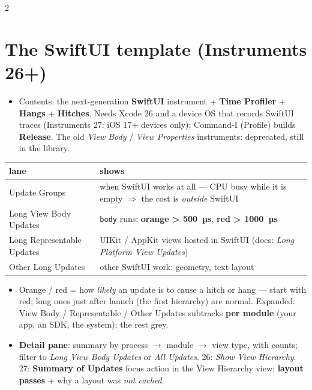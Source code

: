 \documentclass[8pt]{extarticle}
\begin{document}
\begin{multicols}{2}
\raggedright

\section{The SwiftUI template (Instruments 26+)}
\begin{itemize}
  \item Contents: the next-generation \textbf{SwiftUI} instrument + \textbf{Time Profiler} +
        \textbf{Hangs} + \textbf{Hitches}. Needs Xcode 26 and a device OS that records SwiftUI
        traces (Instruments 27: iOS 17+ devices only); Command-I (Profile) builds
        \textbf{Release}. The old \emph{View Body} / \emph{View Properties} instruments:
        deprecated, still in the library.
\end{itemize}
{\footnotesize
\begin{tabular}{@{}>{\raggedright\arraybackslash}p{2.15cm}>{\raggedright\arraybackslash}p{5.4cm}@{}}
\toprule
\textbf{lane} & \textbf{shows} \\
\midrule
Update Groups & when SwiftUI works at all — CPU busy while it is empty $\Rightarrow$ the cost is
\emph{outside} SwiftUI \\
Long View Body Updates & \texttt{body} runs: \textcolor{sheetOrange}{\textbf{orange > 500~µs}},
\textcolor{sheetRed}{\textbf{red > 1000~µs}} \\
Long Representable Updates & UIKit / AppKit views hosted in SwiftUI (docs: \emph{Long Platform
View Updates}) \\
Other Long Updates & other SwiftUI work: geometry, text layout \\
\bottomrule
\end{tabular}}
\begin{itemize}
  \item Orange / red = how \emph{likely} an update is to cause a hitch or hang — start with red;
        long ones just after launch (the first hierarchy) are normal. Expanded: View Body /
        Representable / Other Updates subtracks \textbf{per module} (your app, an SDK, the
        system); the rest grey.
  \item \textbf{Detail pane}: summary by process $\to$ module $\to$ view type, with counts;
        filter to \emph{Long View Body Updates} or \emph{All Updates}. 26: \emph{Show View
        Hierarchy}. 27: \textbf{Summary of Updates} focus action in the View Hierarchy view;
        \textbf{layout passes} + why a layout was \emph{not cached}.
\end{itemize}


\end{multicols}
\end{document}
